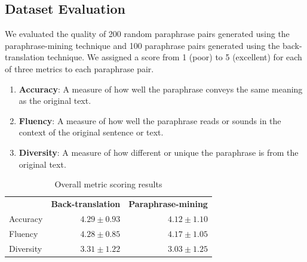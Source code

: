 \documentclass[fleqn,moreauthors,10pt]{ds_report}
\begin{document}
\subsection{Dataset Evaluation}

 We evaluated the quality of 200 random paraphrase pairs generated using the paraphrase-mining technique and 100 paraphrase pairs generated using the back-translation technique. We assigned a score from 1 (poor) to 5 (excellent) for each of three metrics to each paraphrase pair.

\begin{enumerate}
    \item \textbf{Accuracy}: A measure of how well the paraphrase conveys the same meaning as the original text. 

    \item \textbf{Fluency}: A measure of how well the paraphrase reads or sounds in the context of the original sentence or text. 

    \item \textbf{Diversity}: A measure of how different or unique the paraphrase is from the original text. 
\end{enumerate}

\begin{table}[!h]
\caption{Overall metric scoring results}
\begin{tabular}{lrr}
          & \multicolumn{1}{c}{\textbf{Back-translation}} & \multicolumn{1}{c}{\textbf{Paraphrase-mining}} \\
Accuracy  & $4.29 \pm 0.93$                                       & $4.12 \pm 1.10$                                              \\
Fluency   & $4.28 \pm 0.85$                                       & $4.17 \pm 1.05$                                              \\
Diversity & $3.31 \pm 1.22$                                       & $3.03 \pm 1.25$                             

\end{tabular}
\end{table}
\end{document}
